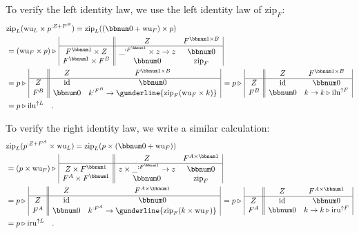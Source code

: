 To verify the left identity law, we use the left identity law of $\text{zip}_{F}$:
\begin{align*}
 & \text{zip}_{L}(\text{wu}_{L}\times p^{:Z+F^{B}})=\text{zip}_{L}((\bbnum 0+\text{wu}_{F})\times p)\\
 & =(\text{wu}_{F}\times p)\triangleright\,\begin{array}{|c||cc|}
 & Z & F^{\bbnum 1\times B}\\
\hline F^{\bbnum 1}\times Z & \_^{:F^{\bbnum 1}}\times z\rightarrow z & \bbnum 0\\
F^{\bbnum 1}\times F^{B} & \bbnum 0 & \text{zip}_{F}
\end{array}\\
 & =p\triangleright\,\begin{array}{|c||cc|}
 & Z & F^{\bbnum 1\times B}\\
\hline Z & \text{id} & \bbnum 0\\
F^{B} & \bbnum 0 & k^{:F^{B}}\rightarrow\gunderline{\text{zip}_{F}(\text{wu}_{F}\times k)}
\end{array}\,=p\triangleright\,\begin{array}{|c||cc|}
 & Z & F^{\bbnum 1\times B}\\
\hline Z & \text{id} & \bbnum 0\\
F^{B} & \bbnum 0 & k\rightarrow k\triangleright\text{ilu}^{\uparrow F}
\end{array}\\
 & =p\triangleright\text{ilu}^{\uparrow L}\quad.
\end{align*}

To verify the right identity law, we write a similar calculation:
\begin{align*}
 & \text{zip}_{L}(p^{:Z+F^{A}}\times\text{wu}_{L})=\text{zip}_{L}(p\times(\bbnum 0+\text{wu}_{F}))\\
 & =(p\times\text{wu}_{F})\triangleright\,\begin{array}{|c||cc|}
 & Z & F^{A\times\bbnum 1}\\
\hline Z\times F^{\bbnum 1} & z\times\_^{:F^{\bbnum 1}}\rightarrow z & \bbnum 0\\
F^{A}\times F^{\bbnum 1} & \bbnum 0 & \text{zip}_{F}
\end{array}\\
 & =p\triangleright\,\begin{array}{|c||cc|}
 & Z & F^{A\times\bbnum 1}\\
\hline Z & \text{id} & \bbnum 0\\
F^{A} & \bbnum 0 & k^{:F^{A}}\rightarrow\gunderline{\text{zip}_{F}(k\times\text{wu}_{F})}
\end{array}\,=p\triangleright\,\begin{array}{|c||cc|}
 & Z & F^{A\times\bbnum 1}\\
\hline Z & \text{id} & \bbnum 0\\
F^{A} & \bbnum 0 & k\rightarrow k\triangleright\text{iru}^{\uparrow F}
\end{array}\\
 & =p\triangleright\text{iru}^{\uparrow L}\quad.
\end{align*}

